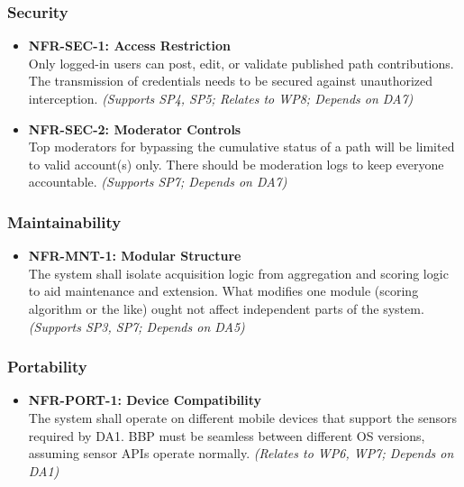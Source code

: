 \subsubsection*{Security}

\begin{itemize}

    \item \textbf{NFR-SEC-1: Access Restriction}
    \label{req:NFR-SEC-1}\\
    Only logged-in users can post, edit, or validate published path contributions. The transmission of credentials needs to be secured against unauthorized interception.
    \textit{(Supports SP4, SP5; Relates to WP8; Depends on DA7)}

    \item \textbf{NFR-SEC-2: Moderator Controls}
    \label{req:NFR-SEC-2}\\
    Top moderators for bypassing the cumulative status of a path will be limited to valid account(s) only. There should be moderation logs to keep everyone accountable.
    \textit{(Supports SP7; Depends on DA7)}

\end{itemize}

\subsubsection*{Maintainability}

\begin{itemize}

    \item \textbf{NFR-MNT-1: Modular Structure}
    \label{req:NFR-MNT-1}\\
    The system shall isolate acquisition logic from aggregation and scoring logic to aid maintenance and extension. What modifies one module (scoring algorithm or the like) ought not affect independent parts of the system.
    \textit{(Supports SP3, SP7; Depends on DA5)}

\end{itemize}

\subsubsection*{Portability}

\begin{itemize}

    \item \textbf{NFR-PORT-1: Device Compatibility}
    \label{req:NFR-PORT-1}\\
    The system shall operate on different mobile devices that support the sensors required by DA1. BBP must be seamless between different OS versions, assuming sensor APIs operate normally.
    \textit{(Relates to WP6, WP7; Depends on DA1)}

\end{itemize}


